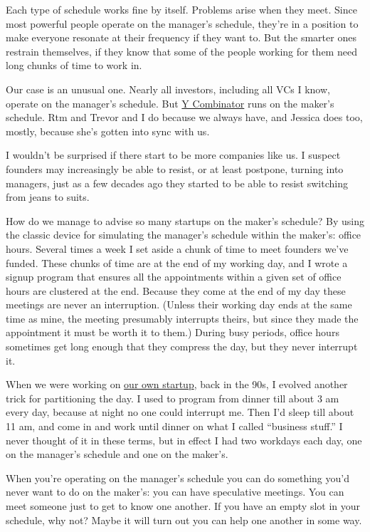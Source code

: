 Each type of schedule works fine by itself. Problems arise when they
meet. Since most powerful people operate on the manager's schedule,
they're in a position to make everyone resonate at their frequency if
they want to. But the smarter ones restrain themselves, if they know
that some of the people working for them need long chunks of time to
work in.

Our case is an unusual one. Nearly all investors, including all VCs I
know, operate on the manager's schedule. But
\href{http://ycombinator.com}{Y Combinator} runs on the maker's
schedule. Rtm and Trevor and I do because we always have, and Jessica
does too, mostly, because she's gotten into sync with us.

I wouldn't be surprised if there start to be more companies like us. I
suspect founders may increasingly be able to resist, or at least
postpone, turning into managers, just as a few decades ago they started
to be able to resist switching from jeans to suits.

How do we manage to advise so many startups on the maker's schedule? By
using the classic device for simulating the manager's schedule within
the maker's: office hours. Several times a week I set aside a chunk of
time to meet founders we've funded. These chunks of time are at the end
of my working day, and I wrote a signup program that ensures all the
appointments within a given set of office hours are clustered at the
end. Because they come at the end of my day these meetings are never an
interruption. (Unless their working day ends at the same time as mine,
the meeting presumably interrupts theirs, but since they made the
appointment it must be worth it to them.) During busy periods, office
hours sometimes get long enough that they compress the day, but they
never interrupt it.

When we were working on \href{start.html}{our own startup}, back in the
90s, I evolved another trick for partitioning the day. I used to program
from dinner till about 3 am every day, because at night no one could
interrupt me. Then I'd sleep till about 11 am, and come in and work
until dinner on what I called ``business stuff.'' I never thought of it
in these terms, but in effect I had two workdays each day, one on the
manager's schedule and one on the maker's.

When you're operating on the manager's schedule you can do something
you'd never want to do on the maker's: you can have speculative
meetings. You can meet someone just to get to know one another. If you
have an empty slot in your schedule, why not? Maybe it will turn out you
can help one another in some way.

